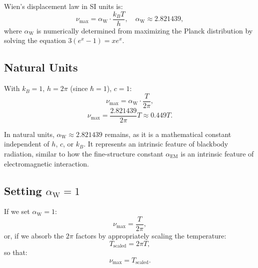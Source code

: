 \documentclass[12pt,a4paper]{article}
\newcommand{\alphaEM}{\alpha_{\text{EM}}}
\newcommand{\alphaW}{\alpha_{\text{W}}}
\begin{document}
	Wien’s displacement law in SI units is:
	\[
	\nu_{\text{max}} = \alphaW \cdot \frac{k_B T}{h}, \quad \alphaW \approx 2.821439,
	\]
	where \(\alphaW\) is numerically determined from maximizing the Planck distribution by solving the equation \(3 (e^x - 1) = x e^x\).
	
	\subsection{Natural Units}
	
	With \(k_B = 1\), \(h = 2\pi\) (since \(\hbar = 1\)), \(c = 1\):
	\[
	\nu_{\text{max}} = \alphaW \cdot \frac{T}{2\pi},
	\]
	\[
	\nu_{\text{max}} = \frac{2.821439}{2\pi} T \approx 0.449 T.
	\]
	
	In natural units, \(\alphaW \approx 2.821439\) remains, as it is a mathematical constant independent of \(h\), \(c\), or \(k_B\). It represents an intrinsic feature of blackbody radiation, similar to how the fine-structure constant \(\alphaEM\) is an intrinsic feature of electromagnetic interaction.
	
	\subsection{Setting \(\alphaW = 1\)}
	
	If we set \(\alphaW = 1\):
	\[
	\nu_{\text{max}} = \frac{T}{2\pi},
	\]
	or, if we absorb the \(2\pi\) factors by appropriately scaling the temperature:
	\[
	T_{\text{scaled}} = 2\pi T,
	\]
	so that:
	\[
	\nu_{\text{max}} = T_{\text{scaled}}.
	\]
	
\end{document}
